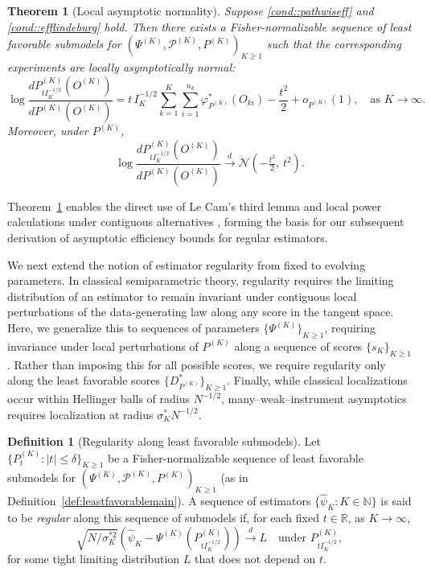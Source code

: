 \documentclass[11pt]{article}
\theoremstyle{plain}
\newtheorem{theorem}{Theorem}
\theoremstyle{definition}
\newtheorem{definition}{Definition}
\theoremstyle{remark}
\theoremstyle{definition}
\begin{document}
\begin{theorem}[Local asymptotic normality]
\label{theorem::LANmain}
Suppose \ref{cond::pathwiseff} and \ref{cond::efflindeburg} hold.  
Then there exists a Fisher-normalizable sequence of least favorable submodels for \( (\Psi^{(K)}, \mathcal{P}^{(K)}, P^{(K)})_{K \ge 1} \) such that the corresponding experiments are locally asymptotically normal:
\[
\log \frac{dP_{t I_K^{-1/2}}^{(K)}(O^{(K)})}{dP^{(K)}(O^{(K)})} 
= t\,I_K^{-1/2} \sum_{k=1}^K \sum_{i=1}^{n_k} \varphi_{P^{(K)}}^*(O_{ki}) 
- \frac{t^2}{2} + o_{P^{(K)}}(1), \quad \text{as } K \to \infty.
\]
Moreover, under \( P^{(K)} \),
\[
\log \frac{dP_{t I_K^{-1/2}}^{(K)}(O^{(K)})}{dP^{(K)}(O^{(K)})}
\overset{d}{\to} \mathcal{N}\!\left(-\tfrac{t^2}{2},\, t^2\right).
\]
\end{theorem}
Theorem~\ref{theorem::LANmain} enables the direct use of Le Cam’s third lemma and local power calculations under contiguous alternatives \citep{van2000asymptotic}, forming the basis for our subsequent derivation of asymptotic efficiency bounds for regular estimators.

We next extend the notion of estimator regularity from fixed to evolving parameters.  In classical semiparametric theory, regularity requires the limiting distribution of an estimator to remain invariant under contiguous local perturbations of the data-generating law along any score in the tangent space.  
Here, we generalize this to sequences of parameters \(\{\Psi^{(K)}\}_{K \ge 1}\), requiring invariance under local perturbations of \(P^{(K)}\) along a sequence of scores \(\{s_K\}_{K \ge 1}\).  
Rather than imposing this for all possible scores, we require regularity only along the least favorable scores \(\{D_{P^{(K)}}^*\}_{K \ge 1}\).  
Finally, while classical localizations occur within Hellinger balls of radius \(N^{-1/2}\), many--weak--instrument asymptotics requires localization at radius \(\sigma_K^* N^{-1/2}\).


 

\begin{definition}[Regularity along least favorable submodels]
\label{def:regularity}
Let \( \{P_t^{(K)} : |t| \le \delta\}_{K \ge 1} \) be a Fisher-normalizable sequence of least favorable submodels for \((\Psi^{(K)}, \mathcal{P}^{(K)}, P^{(K)})_{K \ge 1}\) (as in Definition~\ref{def:leastfavorablemain}).  
A sequence of estimators \( \{\widehat{\psi}_K : K \in \mathbb{N} \} \) is said to be \emph{regular} along this sequence of submodels if, for each fixed \( t \in \mathbb{R} \), as \( K \to \infty \),
\[
\sqrt{N / \sigma_K^{*2}} 
\left( \widehat{\psi}_K - \Psi^{(K)}(P_{t I_K^{-1/2}}^{(K)}) \right)
\stackrel{d}{\longrightarrow} L
\quad \text{under } P_{t I_K^{-1/2}}^{(K)},
\]
for some tight limiting distribution \( L \) that does not depend on \( t \).
\end{definition}
\end{document}
